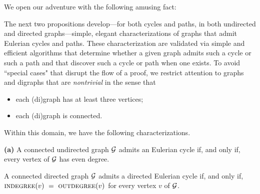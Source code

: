 \smallskip

We open our adventure with the following amusing fact:

\bigskip


\noindent {}

\bigskip

The next two propositions develop---for both cycles and paths, in both undirected and directed graphs---simple, elegant characterizations of graphs that admit Eulerian cycles and paths.
These characterization are validated via simple and efficient algorithms that determine whether a given graph admits such a cycle or such a path and that discover such a cycle or path when one exists.  To avoid ``special cases" that disrupt the flow of a proof, we restrict attention to graphs and digraphs that are {\em nontrivial} in the sense that
\begin{itemize}
\item
each (di)graph has at least three vertices;
\medskip\item
each (di)graph is connected.
\end{itemize}
Within this domain, we have the following characterizations.

\begin{prop}
\label{thm:eulerian-cycle}
{\bf (a)}
A connected undirected graph $\mbox{$\cal G$}$ admits an Eulerian cycle if, and only if, every vertex of $\mbox{$\cal G$}$ has even degree.

\smallskip

A connected directed graph $\mbox{$\cal G$}$ admits a directed Eulerian cycle if, and only if, $\mbox{\sc indegree}(v) \ = \ \mbox{\sc outdegree}(v)$ for every vertex $v$ of $\mbox{$\cal G$}$.
\end{prop}

